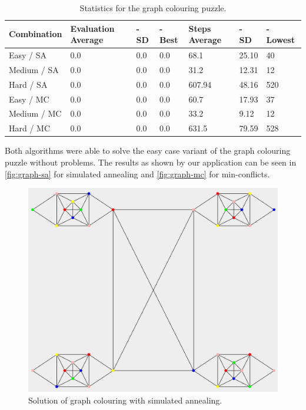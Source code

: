 \documentclass{scrartcl}
\begin{document}
\begin{table}[!htbp]
\caption{Statistics for the graph colouring puzzle.}
\begin{tabularx}{\textwidth}{l | X | X | X | X | X | X}
Combination & Evaluation  \newline Average & - \newline SD & - \newline Best & Steps \newline Average & - \newline SD & - \newline Lowest \\
\hline
Easy / SA & 0.0 & 0.0 & 0.0 & 68.1 & 25.10 & 40 \\
Medium / SA & 0.0 & 0.0 & 0.0 & 31.2 & 12.31 & 12  \\
Hard / SA & 0.0 & 0.0 & 0.0 & 607.94 & 48.16 & 520  \\
Easy / MC & 0.0 & 0.0 & 0.0 & 60.7 & 17.93 & 37  \\
Medium / MC & 0.0 & 0.0 & 0.0 & 33.2 & 9.12 & 12  \\
Hard / MC & 0.0 & 0.0 & 0.0 & 631.5 & 79.59 & 528   \\
\end{tabularx}
\end{table}


Both algorithms were able to solve the easy case variant of the graph colouring puzzle without problems. The results as shown by our application can be seen in \autoref{fig:graph-sa} for simulated annealing and \autoref{fig:graph-mc} for min-conflicts.

 \begin{figure}[!htbp]
 \includegraphics[width=1.0\linewidth]{graphics/graph-sa.png}
\caption{Solution of graph colouring with simulated annealing.}\label{fig:graph-sa}
 \end{figure}
 
\end{document}
